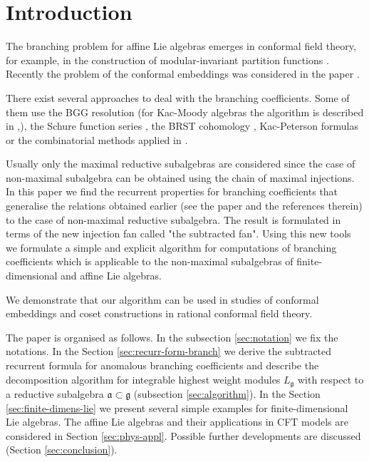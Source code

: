 \documentclass[12pt]{iopart}
\begin{document}
\section{Introduction}
\label{sec:introduction}

The branching problem for affine Lie algebras emerges in conformal field theory, for example, in the construction of modular-invariant partition functions \cite{difrancesco1997cft}. Recently the problem of the conformal embeddings was considered in the paper \cite{coquereaux2008conformal}.

There exist several approaches to deal with the branching coefficients. Some of them use the BGG
resolution \cite{bernstein1975differential} (for Kac-Moody algebras the algorithm is described in
\cite{kac1990idl},\cite{wakimoto2001idl}), the Schure function series \cite{fauser2006new}, the BRST
cohomology \cite{Hwang:1994yr}, Kac-Peterson formulas \cite{kac1990idl,quella2002branching} or the
combinatorial methods applied in \cite{feigin707principal}.

Usually only the maximal reductive subalgebras are considered since the case of non-maximal subalgebra
can be obtained using the chain of maximal injections. In this paper we find the recurrent properties
for branching coefficients that generalise the relations obtained earlier (see the paper \cite{ilyin812pbc}
and the references therein) to the case of non-maximal reductive subalgebra. The result is formulated in
terms of the new injection fan called "the subtracted fan". Using this new tools we formulate a simple and
explicit algorithm for computations of branching coefficients which is applicable to the non-maximal
subalgebras of finite-dimensional and affine Lie algebras.

We demonstrate that our algorithm can be used in studies of conformal embeddings and coset constructions
in rational conformal field theory.

The paper is organised as follows. In the subsection \ref{sec:notation}  we fix the notations.
In the Section \ref{sec:recurr-form-branch} we derive the subtracted recurrent formula for anomalous
branching coefficients and describe the decomposition algorithm for integrable highest weight modules
$L_{\mathfrak{g}}$ with respect to a reductive subalgebra $\mathfrak{a}\subset \mathfrak{g}$
(subsection \ref{sec:algorithm}). In the Section \ref{sec:finite-dimens-lie} we present several
simple examples for finite-dimensional Lie algebras. The affine Lie algebras and their applications in
CFT models are considered in Section \ref{sec:phys-appl}.
Possible further developments are discussed (Section \ref{sec:conclusion}).
\end{document}
